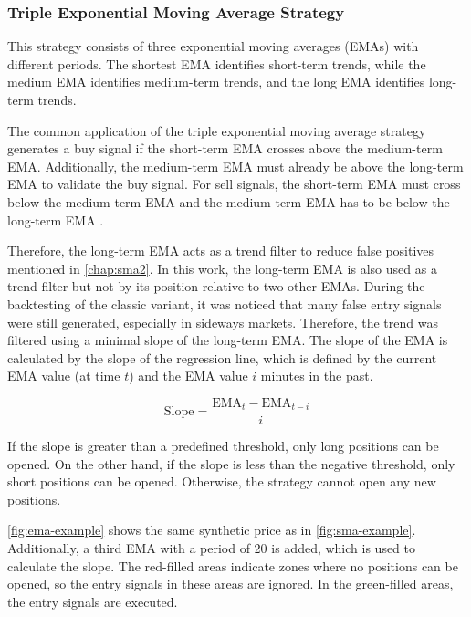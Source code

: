 \subsubsection{Triple Exponential Moving Average Strategy}

This strategy consists of three exponential moving averages (EMAs) with different periods.
The shortest EMA identifies short-term trends, while the medium EMA identifies medium-term trends, and the long EMA identifies long-term trends.

The common application of the triple exponential moving average strategy generates a buy signal if the short-term EMA crosses above the medium-term EMA.
Additionally, the medium-term EMA must already be above the long-term EMA to validate the buy signal.
For sell signals, the short-term EMA must cross below the medium-term EMA and the medium-term EMA has to be below the long-term EMA \cite{ema3-basics}.

Therefore, the long-term EMA acts as a trend filter to reduce false positives mentioned in \autoref{chap:sma2}.
In this work, the long-term EMA is also used as a trend filter but not by its position relative to two other EMAs.
During the backtesting of the classic variant, it was noticed that many false entry signals were still generated, especially in sideways markets.
Therefore, the trend was filtered using a minimal slope of the long-term EMA.
The slope of the EMA is calculated by the slope of the regression line, which is defined by the current EMA value (at time $t$) and the EMA value $i$ minutes in the past.

\[
    \text{Slope} = \frac{\text{EMA}_t - \text{EMA}_{t-i}}{i}
\]

\noindent
If the slope is greater than a predefined threshold, only long positions can be opened.
On the other hand, if the slope is less than the negative threshold, only short positions can be opened.
Otherwise, the strategy cannot open any new positions.

\autoref{fig:ema-example} shows the same synthetic price as in \autoref{fig:sma-example}.
Additionally, a third EMA with a period of 20 is added, which is used to calculate the slope.
The red-filled areas indicate zones where no positions can be opened, so the entry signals in these areas are ignored.
In the green-filled areas, the entry signals are executed.


